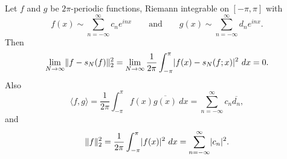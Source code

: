\begin{thm} 
Let $f$ and $g$ be $2\pi$-periodic functions, Riemann integrable 
on $[-\pi,\pi]$
with
\begin{equation*}
f(x) \sim
\sum_{n=-\infty}^\infty c_n e^{inx}
\qquad \text{and} \qquad
g(x) \sim
\sum_{n=-\infty}^\infty d_n e^{inx} .
\end{equation*}
Then
\begin{equation*}
\lim_{N\to\infty} \lVert {f-s_N(f)} \rVert_2^2 = 
\lim_{N\to\infty}
\frac{1}{2\pi}
\int_{-\pi}^\pi
\lvert {f(x)-s_N(f;x)} \rvert^2 ~ dx
=0 .
\end{equation*}
Also
\begin{equation*}
\langle f , g \rangle =
\frac{1}{2\pi}
\int_{-\pi}^\pi
f(x) \overline{g(x)}~ dx
=
\sum_{n=-\infty}^\infty c_n \overline{d_n} ,
\end{equation*}
and
\begin{equation*}
\lVert {f} \rVert_2^2
=
\frac{1}{2\pi}
\int_{-\pi}^\pi
\lvert {f(x)} \rvert^2 ~ dx
=
\sum_{n=-\infty}^\infty \lvert {c_n} \rvert^2.
\end{equation*}
\end{thm}

